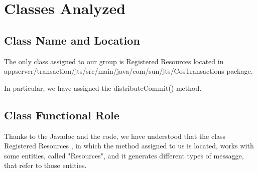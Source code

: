 \section{Classes Analyzed}
\subsection{Class Name and Location}
	The only class assigned to our group is \ttfamily Registered Resources \normalfont located in \ttfamily appserver/transaction/jts/src/main/java/com/sun/jts/CosTransactions \normalfont package.
	
	In particular, we have assigned the \ttfamily distributeCommit() \normalfont method.
	
\subsection{Class Functional Role}
	Thanks to the Javadoc and the code, we have understood that the class \ttfamily Registered Resources \normalfont , in which the method assigned to us is located, works with some entities, called "Resources", and it generates different types of messagge, that refer to those entities. 